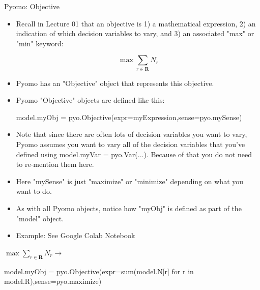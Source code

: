 \documentclass[10pt, aspectratio=169]{beamer}
\begin{document}
\begin{frame}{Pyomo: Objective}
    \begin{itemize}
        \item Recall in Lecture 01 that an objective is 1) a mathematical expression, 2) an indication of which decision variables to vary, and 3) an associated "max" or "min" keyword:
        
        $$\max \sum_{r \in \textbf{R}}N_r$$

        \item Pyomo has an "Objective" object that represents this objective.
        \item Pyomo "Objective" objects are defined like this:
        
        \hspace{0.25cm} model.myObj = pyo.Objective(expr=myExpression,sense=pyo.mySense)
    
        \item Note that since there are often lots of decision variables you want to vary, Pyomo assumes you want to vary all of the decision variables that you've defined using model.myVar = pyo.Var(...). Because of that you do not need to re-mention them here.
        \item Here "mySense" is just "maximize" or "minimize" depending on what you want to do.
        \item As with all Pyomo objects, notice how "myObj" is defined as part of the "model" object.
        \item Example: See Google Colab Notebook
    \end{itemize}

    \begin{center}
        $\max \sum_{r \in \textbf{R}} N_r \rightarrow$ 
        
        model.myObj = pyo.Objective(expr=sum(model.N[r] for r in model.R),sense=pyo.maximize) 
    \end{center}
\end{frame}
\end{document}
